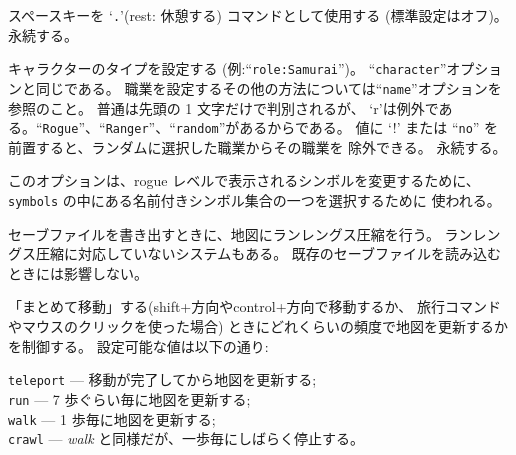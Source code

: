 \item[\ib{rest\verb+_+on\verb+_+space}]
スペースキーを `{\tt .}'(rest: 休憩する) コマンドとして使用する
(標準設定はオフ)。
永続する。
\item[\ib{role}]
キャラクターのタイプを設定する (例:``{\tt role:Samurai}'')。
``{\tt character}''オプションと同じである。
職業を設定するその他の方法については``{\tt name}''オプションを参照のこと。
普通は先頭の 1 文字だけで判別されるが、
`r'は例外である。``{\tt Rogue}''、``{\tt Ranger}''、``{\tt random}''があるからである。
値に `!' または ``{\tt no}'' を前置すると、ランダムに選択した職業からその職業を
除外できる。
永続する。
\item[\ib{roguesymset}]
このオプションは、rogue レベルで表示されるシンボルを変更するために、
{\tt symbols} の中にある名前付きシンボル集合の一つを選択するために
使われる。
\item[\ib{rlecomp}]
セーブファイルを書き出すときに、地図にランレングス圧縮を行う。
ランレングス圧縮に対応していないシステムもある。
既存のセーブファイルを読み込むときには影響しない。
\item[\ib{runmode}]
「まとめて移動」する(shift+方向やcontrol+方向で移動するか、
旅行コマンドやマウスのクリックを使った場合)
ときにどれくらいの頻度で地図を更新するかを制御する。
設定可能な値は以下の通り:

{\tt teleport} --- 移動が完了してから地図を更新する;\\
{\tt run} --- 7 歩ぐらい毎に地図を更新する;\\
{\tt walk} --- 1 歩毎に地図を更新する;\\
{\tt crawl} --- {\it walk\/} と同様だが、一歩毎にしばらく停止する。

